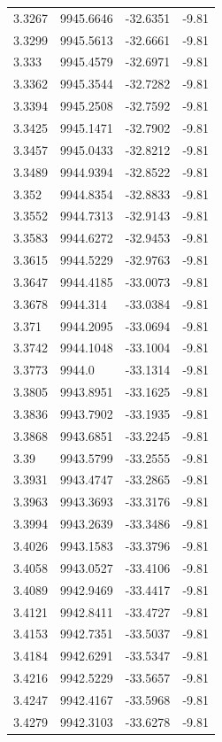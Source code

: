 \begin{table}[H]
\begin{tabular}{llll}
3.3267 & 9945.6646 & -32.6351 & -9.81 \\
3.3299 & 9945.5613 & -32.6661 & -9.81 \\
3.333 & 9945.4579 & -32.6971 & -9.81 \\
3.3362 & 9945.3544 & -32.7282 & -9.81 \\
3.3394 & 9945.2508 & -32.7592 & -9.81 \\
3.3425 & 9945.1471 & -32.7902 & -9.81 \\
3.3457 & 9945.0433 & -32.8212 & -9.81 \\
3.3489 & 9944.9394 & -32.8522 & -9.81 \\
3.352 & 9944.8354 & -32.8833 & -9.81 \\
3.3552 & 9944.7313 & -32.9143 & -9.81 \\
3.3583 & 9944.6272 & -32.9453 & -9.81 \\
3.3615 & 9944.5229 & -32.9763 & -9.81 \\
3.3647 & 9944.4185 & -33.0073 & -9.81 \\
3.3678 & 9944.314 & -33.0384 & -9.81 \\
3.371 & 9944.2095 & -33.0694 & -9.81 \\
3.3742 & 9944.1048 & -33.1004 & -9.81 \\
3.3773 & 9944.0 & -33.1314 & -9.81 \\
3.3805 & 9943.8951 & -33.1625 & -9.81 \\
3.3836 & 9943.7902 & -33.1935 & -9.81 \\
3.3868 & 9943.6851 & -33.2245 & -9.81 \\
3.39 & 9943.5799 & -33.2555 & -9.81 \\
3.3931 & 9943.4747 & -33.2865 & -9.81 \\
3.3963 & 9943.3693 & -33.3176 & -9.81 \\
3.3994 & 9943.2639 & -33.3486 & -9.81 \\
3.4026 & 9943.1583 & -33.3796 & -9.81 \\
3.4058 & 9943.0527 & -33.4106 & -9.81 \\
3.4089 & 9942.9469 & -33.4417 & -9.81 \\
3.4121 & 9942.8411 & -33.4727 & -9.81 \\
3.4153 & 9942.7351 & -33.5037 & -9.81 \\
3.4184 & 9942.6291 & -33.5347 & -9.81 \\
3.4216 & 9942.5229 & -33.5657 & -9.81 \\
3.4247 & 9942.4167 & -33.5968 & -9.81 \\
3.4279 & 9942.3103 & -33.6278 & -9.81 \\

\end{tabular}
\end{table}
